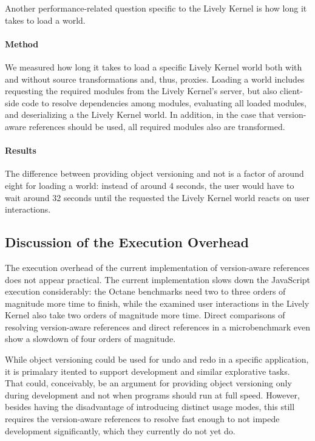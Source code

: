 Another performance-related question specific to the Lively Kernel is how long it takes to load a world.

\paragraph{Method}
We measured how long it takes to load a specific Lively Kernel world both with and without source transformations and, thus, proxies.
Loading a world includes requesting the required modules from the Lively Kernel's server, but also client-side code to resolve dependencies among modules, evaluating all loaded modules, and deserializing a the Lively Kernel world.
In addition, in the case that version-aware references should be used, all required modules also are transformed.

\paragraph{Results}
The difference between providing object versioning and not is a factor of around eight for loading a world: instead of around 4 seconds, the user would have to wait around 32 seconds until the requested the Lively Kernel world reacts on user interactions.




\subsection{Discussion of the Execution Overhead}

The execution overhead of the current implementation of version-aware references does not appear practical.
The current implementation slows down the JavaScript execution considerably: the Octane benchmarks need two to three orders of magnitude more time to finish, while the examined user interactions in the Lively Kernel also take two orders of magnitude more time.
Direct comparisons of resolving version-aware references and direct references in a microbenchmark even show a slowdown of four orders of magnitude.

While object versioning could be used for undo and redo in a specific application, it is primalary itented to support development and similar explorative tasks.
That could, conceivably, be an argument for providing object versioning only during development and not when programs should run at full speed.
However, besides having the disadvantage of introducing distinct usage modes, this still requires the version-aware references to resolve fast enough to not impede development significantly, which they currently do not yet do.

